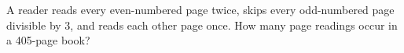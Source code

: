 A reader reads every even-numbered page twice, skips every odd-numbered page divisible by 3, and reads each other page once. How many page readings occur in a 405-page book?

